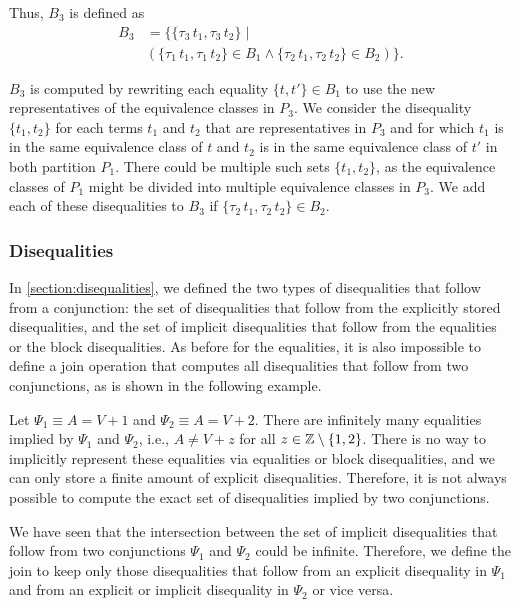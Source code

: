 Thus, $B_3$ is defined as
\[
    \begin{array}{ll}
        B_3 & = \{\{\tau_3\,t_1, \tau_3\,t_2\}  \mid                                                \\
            & (\{\tau_1\,t_1, \tau_1\,t_2\} \in B_1 \land \{\tau_2\,t_1, \tau_2\,t_2\} \in B_2) \}.
    \end{array}
\]

$B_3$ is computed by rewriting each equality $\{t, t'\} \in B_1$ to use the new representatives of the equivalence classes in $P_3$.
We consider the disequality $\{t_1, t_2\}$
for each terms $t_1$ and $t_2$ that are representatives in $P_3$ and for
which $t_1$ is in the same equivalence class of $t$ and $t_2$ is in the same equivalence class of $t'$ in both partition $P_1$.
There could be multiple such sets $\{t_1, t_2\}$,
as the equivalence classes of $P_1$ might be divided into multiple equivalence classes in $P_3$.
We add each of these disequalities to $B_3$ if $\{\tau_2\,t_1, \tau_2\,t_2\} \in B_2$.

\subsubsection{Disequalities}

In \cref{section:disequalities}, we defined the two types of disequalities that follow from a conjunction:
the set of disequalities that follow from the explicitly stored disequalities,
and the set of implicit disequalities that follow from the equalities or the block disequalities.
As before for the equalities, it is also impossible to define a join operation that computes all disequalities that follow from two conjunctions, as is shown in the following example.

\begin{example}
    Let $\Psi_1 \equiv A = V + 1$ and $\Psi_2 \equiv A = V + 2$. There are infinitely many equalities implied by $\Psi_1$ and $\Psi_2$, i.e., $A \neq V + z$ for all $z \in \mathbb{Z} \setminus \{1,2\}$.
    There is no way to implicitly represent these equalities via equalities or block disequalities, and we can only store a finite amount of explicit disequalities.
    Therefore, it is not always possible to compute the exact set of disequalities implied by two conjunctions.
\end{example}

We have seen that the intersection between the set of implicit disequalities that follow from two conjunctions $\Psi_1$ and $\Psi_2$ could be infinite.
Therefore, we define the join to keep only those disequalities that follow from an explicit disequality in $\Psi_1$ and from an explicit or implicit disequality in $\Psi_2$ or vice versa.

